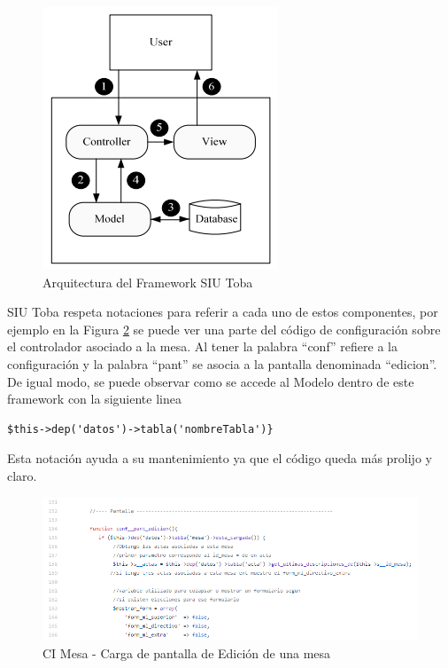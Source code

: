 \begin{figure}[h!]
    \begin{center}
        \includegraphics{img/mvc_arq.png}
    \end{center}
  \caption{Arquitectura del Framework SIU Toba}
  \label{graf:mvcArquitectura}
\end{figure}

SIU Toba respeta notaciones para referir a cada uno de estos componentes, por ejemplo en la Figura \ref{graf:ejemploPantalla} se puede ver una parte del código de configuración sobre el controlador asociado a la mesa. Al tener la palabra ``conf'' refiere a la configuración y la palabra ``pant'' se asocia a la pantalla denominada ``edicion''. De igual modo, se puede observar como se accede al Modelo dentro de este framework con la siguiente linea
\begin{lstlisting}
$this->dep('datos')->tabla('nombreTabla')}
\end{lstlisting}
Esta notación ayuda a su mantenimiento ya que el código queda más prolijo y claro.

\begin{figure}[h!]
    \begin{center}
        \includegraphics[width=\textwidth]{img/ejemplo_pantalla.png}
    \end{center}
  \caption{CI Mesa - Carga de pantalla de Edición de una mesa}
  \label{graf:ejemploPantalla}
\end{figure}


